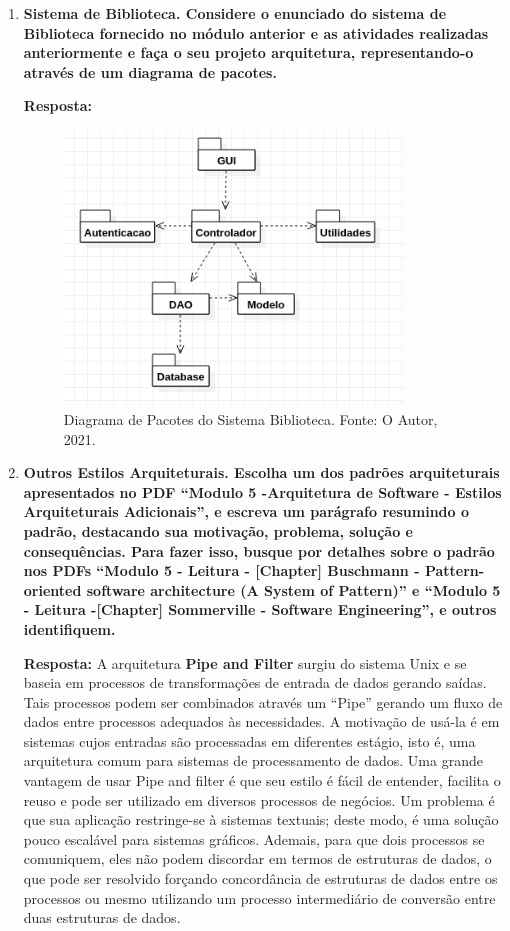 \documentclass[12pt, a4paper]{article}
\newcommand{\tb}[1]{\textbf{#1}}
\newcommand{\question}[1]{\item \tb{#1}}
\newcommand{\answer}[1]{\par \tb{Resposta:} #1}
\newcommand{\quotes}[1]{``#1''}
\begin{document}
\begin{enumerate}[label=\textbf{\arabic*.}]
        \question{
            Sistema de Biblioteca. Considere o enunciado do sistema de Biblioteca fornecido no módulo anterior e as atividades realizadas anteriormente e faça o seu projeto arquitetura, representando-o através de um diagrama de pacotes.
        }
        \answer{
                \begin{figure}[!ht]
               \centering
               \includegraphics[width=0.85\textwidth]{q3.png}
                \caption{Diagrama de Pacotes do Sistema Biblioteca. Fonte: O Autor, 2021.}
               \label{fig:question2}
           \end{figure}
        }
        \newpage
        
        \question{Outros Estilos Arquiteturais. Escolha um dos padrões arquiteturais apresentados no PDF “Modulo 5 -Arquitetura de Software - Estilos Arquiteturais Adicionais”, e escreva um parágrafo resumindo o padrão, destacando sua motivação, problema, solução e consequências. Para fazer isso, busque por detalhes sobre o padrão nos PDFs “Modulo 5 - Leitura - [Chapter] Buschmann - Pattern-oriented software architecture (A System of Pattern)” e “Modulo 5 - Leitura -[Chapter] Sommerville - Software Engineering”, e outros identifiquem.}
        \answer{ 
            A arquitetura \tb{Pipe and Filter} surgiu do sistema Unix e se baseia em processos de transformações de entrada de dados gerando saídas. Tais processos podem ser combinados através um \quotes{Pipe} gerando um fluxo de dados entre processos adequados às necessidades. A motivação de usá-la é em sistemas cujos entradas são processadas em diferentes estágio, isto é, uma arquitetura comum para sistemas de processamento de dados. Uma grande vantagem de usar Pipe and filter é que seu estilo é fácil de entender, facilita o reuso e pode ser utilizado em diversos processos de negócios. Um problema é que sua aplicação restringe-se à sistemas textuais; deste modo, é uma solução pouco escalável para sistemas gráficos. Ademais, para que dois processos se comuniquem, eles não podem discordar em termos de estruturas de dados, o que pode ser resolvido forçando concordância de estruturas de dados entre os processos ou mesmo utilizando um processo intermediário de conversão entre duas estruturas de dados.
        }
    
    \end{enumerate}
        
    
\end{document}
